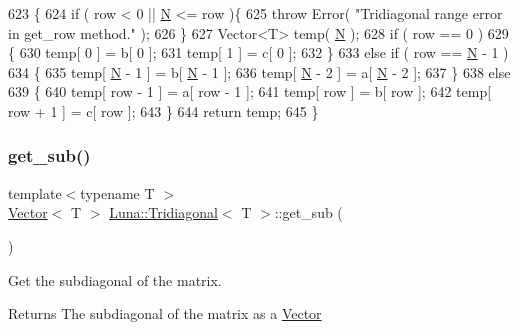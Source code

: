 \begin{DoxyCode}
623   \{
624     \textcolor{keywordflow}{if} ( row < 0 || \hyperlink{namespaceHeat__plot_a7d050092798e28458a263710837bda77}{N} <= row )\{
625       \textcolor{keywordflow}{throw} Error( \textcolor{stringliteral}{"Tridiagonal range error in get\_row method."} );
626     \}
627     Vector<T> temp( \hyperlink{namespaceHeat__plot_a7d050092798e28458a263710837bda77}{N} );
628     \textcolor{keywordflow}{if} ( row == 0 )
629     \{
630       temp[ 0 ] = b[ 0 ];
631       temp[ 1 ] = c[ 0 ];
632     \}
633     \textcolor{keywordflow}{else} \textcolor{keywordflow}{if} ( row == \hyperlink{namespaceHeat__plot_a7d050092798e28458a263710837bda77}{N} - 1 )
634     \{
635       temp[ \hyperlink{namespaceHeat__plot_a7d050092798e28458a263710837bda77}{N} - 1 ] = b[ \hyperlink{namespaceHeat__plot_a7d050092798e28458a263710837bda77}{N} - 1 ];
636       temp[ \hyperlink{namespaceHeat__plot_a7d050092798e28458a263710837bda77}{N} - 2 ] = a[ \hyperlink{namespaceHeat__plot_a7d050092798e28458a263710837bda77}{N} - 2 ];
637     \}
638     \textcolor{keywordflow}{else}
639     \{
640       temp[ row - 1 ] = a[ row - 1 ];
641       temp[ row ]     = b[ row ];
642       temp[ row + 1 ] = c[ row ];
643     \}
644     \textcolor{keywordflow}{return} temp;
645   \}
\end{DoxyCode}
\mbox{\label{classLuna_1_1Tridiagonal_a00675dffdb07936a5252d2a32ca3d983}} 
\subsubsection{\texorpdfstring{get\+\_\+sub()}{get\_sub()}}
{\footnotesize\ttfamily template$<$typename T $>$ \\
\hyperlink{classLuna_1_1Vector}{Vector}$<$ T $>$ \hyperlink{classLuna_1_1Tridiagonal}{Luna\+::\+Tridiagonal}$<$ T $>$\+::get\+\_\+sub (\begin{DoxyParamCaption}{ }\end{DoxyParamCaption})\hspace{0.3cm}{\ttfamily [inline]}}



Get the subdiagonal of the matrix. 

\begin{DoxyReturn}{Returns}
The subdiagonal of the matrix as a \hyperlink{classLuna_1_1Vector}{Vector} 
\end{DoxyReturn}


